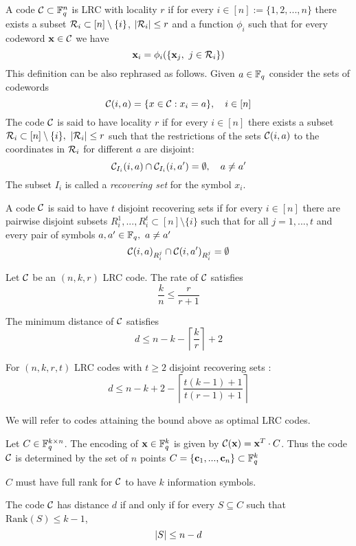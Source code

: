 \begin{defn}
A code ${\mathcal C} \subset {\mathbb F}_q^n$ is LRC with locality $r$ if for every $i \in [n] := \{1,2,...,n\}$ there exists a subset ${\mathcal R}_i \subset [n] \setminus \{i\}$, $\left\vert {{\mathcal R}_i} \right\vert \leq r$ and a function $\phi_i$ such that for every codeword $\mathbf{x} \in {\mathcal C}$ we have
\begin{equation}
\x_i = \phi_i(\{\x_j, \ j \in \R_i \})
\end{equation}
This definition can be also rephrased as follows. Given $a \in {\mathbb F}_q$ consider the sets of codewords
\[{\mathcal C}(i,a) = \{ x \in {\mathcal C} : x_i = a\}, \quad i \in [n]\]
The code ${\mathcal C}$ is said to have locality $r$ if for every $i \in [n]$ there exists a subset ${\mathcal R}_i \subset [n] \setminus \{i\}, \ \left\vert {{\mathcal R}_i} \right\vert \leq r$ such that the restrictions of the sets ${\mathcal C}(i,a)$ to the coordinates in ${\mathcal R}_i$ for different $a$ are disjoint:
    \begin{equation}
        {\mathcal C}_{I_i}(i,a) \cap {\mathcal C}_{I_i}(i,a') = \emptyset, \quad a \neq a'
    \end{equation}
The subset $I_i$ is called a \textit{recovering set} for the symbol $x_i$.
\end{defn}

\begin{defn}
A code ${\mathcal C}$ is said to have $t$ disjoint recovering sets if for every $i \in [n]$ there are pairwise disjoint subsets $R_i^1, ..., R_i^t \subset [n] \setminus \{i\}$ such that for all $j =1, ..., t$ and every pair of symbols $a,a' \in {\mathbb F}_q, \ a \neq a'$
\begin{equation}
{\mathcal C}(i,a)_{R_i^j} \cap {\mathcal C}(i,a')_{R_i^j} = \emptyset
\end{equation}

\end{defn}

Let ${\mathcal C}$ be an $(n,k,r)$ LRC code. The rate of ${\mathcal C}$ satisfies
\begin{equation}
    \frac{k}{n} \leq \frac{r}{r+1}
\end{equation}

The minimum distance of ${\mathcal C}$ satisfies \cite{GHSY12}
\begin{equation}
d \leq n -k - \left\lceil \frac{k}{r} \right\rceil + 2
\end{equation}

For $(n,k,r,t)$ LRC codes with $t \geq 2$ disjoint recovering sets \cite{RPDV16}:
\begin{equation}
    d \leq n-k + 2 - \left\lceil \frac{t(k-1)+1}{t(r-1)+1} \right\rceil
\end{equation}


We will refer to codes attaining the bound above as optimal LRC codes.

Let $C \in {\mathbb F}_q^{k \times n}$. The encoding of $\mathbf{x} \in {\mathbb F}_q^k$ is given by ${\mathcal C}(\mathbf{x}) = \mathbf{x}^T \cdot C$. Thus the code ${\mathcal C}$ is determined by the set of $n$ points $C = \{ \mathbf{c}_1, ... , \mathbf{c}_n \} \subset {\mathbb F}_q^k$

$C$ must have full rank for ${\mathcal C}$ to have $k$ information symbols.

The code ${\mathcal C}$ has distance $d$ if and only if for every $S \subseteq C$ such that $\mbox{Rank}(S) \leq k-1$, 
\begin{equation}
\left\vert {S} \right\vert \leq n-d
\end{equation}